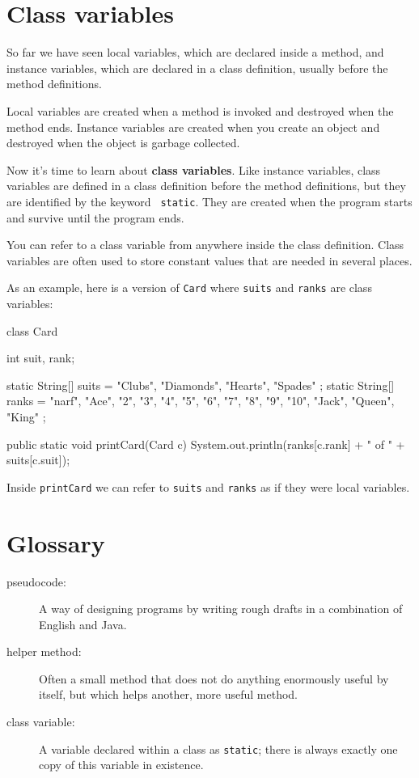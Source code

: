 \section{Class variables}

So far we have seen local variables, which are declared inside
a method, and instance variables, which are declared in a class
definition, usually before the method definitions.

Local variables are created when a method is invoked and destroyed
when the method ends.  Instance variables are created when you
create an object and destroyed when the object is garbage collected.

Now it's time to learn about {\bf class variables}.  Like instance
variables, class variables are defined in a class definition before
the method definitions, but they are identified by the keyword {\tt
  static}.  They are created when the program starts and survive until
the program ends.

You can refer to a class variable from anywhere inside the class
definition.  Class variables are often used to store constant
values that are needed in several places.

As an example, here is a version of {\tt Card} where {\tt suits}
and {\tt ranks} are class variables:

\begin{code}
class Card {
    int suit, rank;

    static String[] suits = { "Clubs", "Diamonds", "Hearts", "Spades" };
    static String[] ranks = { "narf", "Ace", "2", "3", "4", "5", "6",
                      "7", "8", "9", "10", "Jack", "Queen", "King" };

    public static void printCard(Card c) {
        System.out.println(ranks[c.rank] + " of " + suits[c.suit]);
    }
}
\end{code}

Inside {\tt printCard} we can refer to {\tt suits} and {\tt ranks} as
if they were local variables.


\section{Glossary}

\begin{description}

\item[pseudocode:]  A way of designing programs by writing
rough drafts in a combination of English and Java.

\item[helper method:]  Often a small method that does not
do anything enormously useful by itself, but which helps
another, more useful method.

\item[class variable:]  A variable declared within a class as {\tt static};
there is always exactly one copy of this variable in existence.



\end{description}


